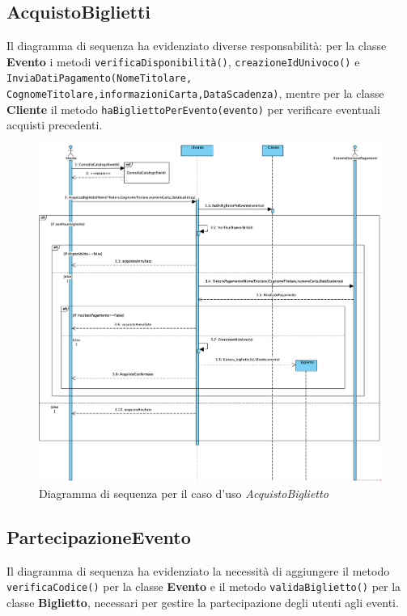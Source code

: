 \subsection{AcquistoBiglietti}

Il diagramma di sequenza ha evidenziato diverse responsabilità: per la classe \textbf{Evento} i metodi \texttt{verificaDisponibilità()}, \texttt{creazioneIdUnivoco()} e \texttt{InviaDatiPagamento(NomeTitolare, CognomeTitolare,informazioniCarta,DataScadenza)}, mentre per la classe \textbf{Cliente} il metodo \texttt{haBigliettoPerEvento(evento)} per verificare eventuali acquisti precedenti.

\begin{figure}[H]
    \centering
    \includegraphics[width=0.8\linewidth]{assets/casid'uso/AcquistoBiglietto.png}
    \caption{Diagramma di sequenza per il caso d'uso \emph{AcquistoBiglietto}}
    \label{fig:acquistobiglietto}
\end{figure}



\subsection{PartecipazioneEvento}

Il diagramma di sequenza ha evidenziato la necessità di aggiungere il metodo \texttt{verificaCodice()} per la classe \textbf{Evento} e il metodo \texttt{validaBiglietto()} per la classe \textbf{Biglietto}, necessari per gestire la partecipazione degli utenti agli eventi.

